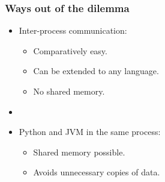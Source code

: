 \documentclass[%
]{beamer}
\newcommand{\cmark}{\ding{51}}%
\newcommand{\xmark}{\ding{55}}%
\newcommand{\rxmark}{\color{red}\xmark}
\begin{document}
\begin{frame}
    \frametitle{Ways out of the dilemma}
    \begin{itemize}
          \item<1-> Inter-process communication:
        \begin{itemize}
              \item<2->[\cmark] Comparatively easy.
              \item<2->[\cmark] Can be extended to any language.
              \item<2->[\rxmark] No shared memory.
        \end{itemize}
        \item[]
        \item<3-> Python and JVM in the same process:
      \begin{itemize}
            \item<4->[\cmark] Shared memory possible.
            \item<4->[\cmark] Avoids unnecessary copies of data.
      \end{itemize}

    \end{itemize}
\end{frame}
\end{document}

